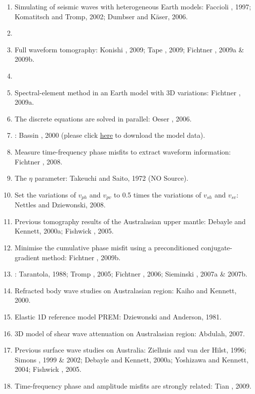 \begin{enumerate}[\hspace{10mm}*]
  \item Simulating of seismic waves with heterogeneous Earth models: Faccioli \etal, 1997;
    Komatitsch and Tromp, 2002; Dumbser and K\"{a}ser, 2006.
  \item \sline
  \item Full waveform tomography: Konishi \etal, 2009; Tape \etal, 2009;
    Fichtner \etal, 2009a \& 2009b.
  \item \sline
  \item Spectral-element method in an Earth model with 3D variations: Fichtner \etal, 2009a.
  \item The discrete equations are solved in parallel: Oeser \etal, 2006.
  \item {}
    :
    Bassin \etal, 2000 (please click \href{http://igppweb.ucsd.edu/~gabi/crust2.html}{here}
    to download the model data).
  \item Measure time-frequency phase misfits to extract waveform information: Fichtner \etal, 2008.
  \item The $\eta$ parameter: Takeuchi and Saito, 1972 (NO Source).
  \item Set the variations of $v_{ph}$ and $v_{pv}$ to 0.5 times
    the variations of $v_{sh}$ and $v_{sv}$: Nettles and Dziewonski, 2008.
  \item Previous tomography results of the Australasian upper mantle:
    Debayle and Kennett, 2000a; Fishwick \etal, 2005.
  \item Minimise the cumulative phase misfit using a preconditioned conjugate-gradient method:
    Fichtner \etal, 2009b.
  \item {}: Tarantola, 1988; Tromp \etal, 2005; Fichtner \etal, 2006;
    Sieminski \etal, 2007a \& 2007b.
  \item Refracted body wave studies on Australasian region: Kaiho and Kennett, 2000.
  \item Elastic 1D reference model PREM: Dziewonski and Anderson, 1981.
  \item 3D model of shear wave attenuation on Australasian region: Abdulah, 2007.
  \item Previous surface wave studies on Australia: Zielhuis and van der Hilst, 1996;
    Simons \etal, 1999 \& 2002; Debayle and Kennett, 2000a; Yoshizawa and Kennett, 2004;
    Fishwick \etal, 2005. 
  \item Time-frequency phase and amplitude misfits are strongly related: Tian \etal, 2009.

\end{enumerate}

